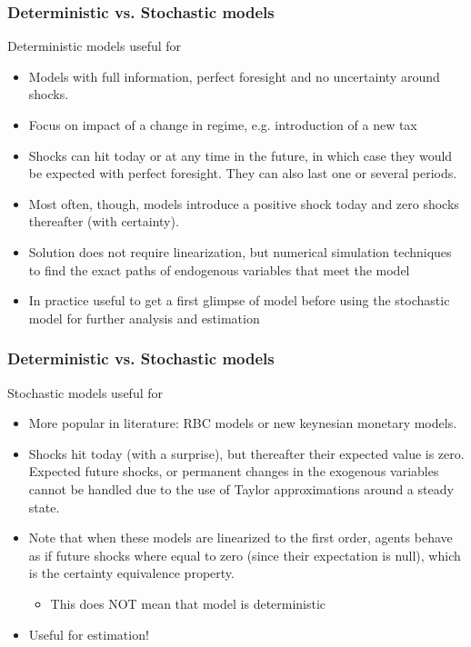 \documentclass[handout]{beamer}  %
\begin{document}
\begin{frame}\frametitle{Deterministic vs. Stochastic models}
Deterministic models useful for
		\begin{itemize}
			\item Models with full information, perfect foresight and no uncertainty around shocks.
			\item Focus on impact of a change in regime, e.g. introduction of a new tax
			\item Shocks can hit today or at any time in the future, in which case they would be expected with perfect foresight. They can also last	one or several periods.
			\item Most often, though, models introduce a positive shock today and zero shocks thereafter (with certainty).
			\item Solution does not require linearization, but numerical simulation techniques to find the	exact paths of endogenous variables that meet the model
			\item In practice useful to get a first glimpse of model before using the stochastic model for further analysis and estimation
		\end{itemize}
\end{frame}

\begin{frame}\frametitle{Deterministic vs. Stochastic models}
Stochastic models useful for
		\begin{itemize}
			\item 	More popular in literature: RBC models or new keynesian monetary models.
			\item Shocks hit today (with a surprise), but thereafter their expected value is zero. Expected future shocks, or permanent changes in the exogenous variables cannot be handled due to the use of Taylor approximations around a steady state.
			\item Note that when these models are linearized to the first order, agents behave as if future shocks where equal to zero (since their expectation is null), which is the certainty equivalence property.
			\begin{itemize}
				\item This does NOT mean that model is deterministic
			\end{itemize}
		\item Useful for estimation!
		\end{itemize}
		
\end{frame}
\end{document}

